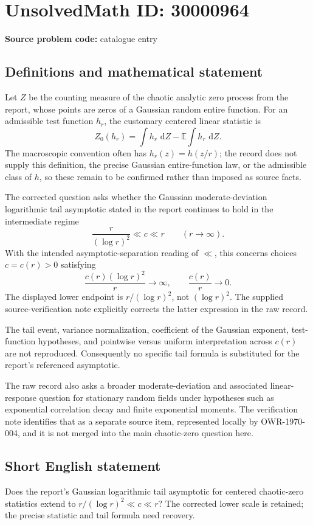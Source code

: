 \documentclass[11pt]{article}
\newcommand{\E}{\mathbb{E}}
\newcommand{\dd}{\,\mathrm{d}}
\begin{document}
\section*{UnsolvedMath ID: 30000964}
\textbf{Source problem code:} catalogue entry
\subsection{Definitions and mathematical statement}
Let \(Z\) be the counting measure of the chaotic analytic zero process from the report, whose points are zeros of a Gaussian random entire function. For an admissible test function \(h_r\), the customary centered linear statistic is
\[
Z_0(h_r)=\int h_r\,\dd Z-\E\int h_r\,\dd Z.
\]
The macroscopic convention often has \(h_r(z)=h(z/r)\); the record does not supply this definition, the precise Gaussian entire-function law, or the admissible class of \(h\), so these remain to be confirmed rather than imposed as source facts.

The corrected question asks whether the Gaussian moderate-deviation logarithmic tail asymptotic stated in the report continues to hold in the intermediate regime
\[
\frac{r}{(\log r)^2}\ll c\ll r\qquad(r\to\infty).
\]
With the intended asymptotic-separation reading of \(\ll\), this concerns choices \(c=c(r)>0\) satisfying
\[
\frac{c(r)(\log r)^2}{r}\longrightarrow\infty,
\qquad \frac{c(r)}r\longrightarrow0.
\]
The displayed lower endpoint is \(r/(\log r)^2\), not \((\log r)^2\). The supplied source-verification note explicitly corrects the latter expression in the raw record.

The tail event, variance normalization, coefficient of the Gaussian exponent, test-function hypotheses, and pointwise versus uniform interpretation across \(c(r)\) are not reproduced. Consequently no specific tail formula is substituted for the report's referenced asymptotic.

The raw record also asks a broader moderate-deviation and associated linear-response question for stationary random fields under hypotheses such as exponential correlation decay and finite exponential moments. The verification note identifies that as a separate source item, represented locally by OWR-1970-004, and it is not merged into the main chaotic-zero question here.
\subsection{Short English statement}
Does the report's Gaussian logarithmic tail asymptotic for centered chaotic-zero statistics extend to \(r/(\log r)^2\ll c\ll r\)? The corrected lower scale is retained; the precise statistic and tail formula need recovery.
\end{document}
